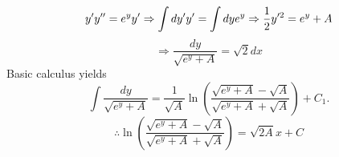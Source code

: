 \item

\[
	y' y'' = e^y y'
	\Rightarrow \int dy' y' = \int dy e^y
	\Rightarrow \frac{1}{2} y'^2 = e^y + A
\]
\[
	\Rightarrow \frac{dy}{\sqrt{e^y + A}} = \sqrt{2} dx
\]
Basic calculus yields
\[
	\int \frac{dy}{\sqrt{e^y + A}}
	= \frac{1}{\sqrt{A}} \ln \left( \frac{\sqrt{e^y + A} - \sqrt{A}}{\sqrt{e^y + A} + \sqrt{A}} \right) + C_1.
\]
\[
	\therefore \ln \left( \frac{\sqrt{e^y + A} - \sqrt{A}}{\sqrt{e^y + A} + \sqrt{A}} \right) = \sqrt{2A}x + C
\]